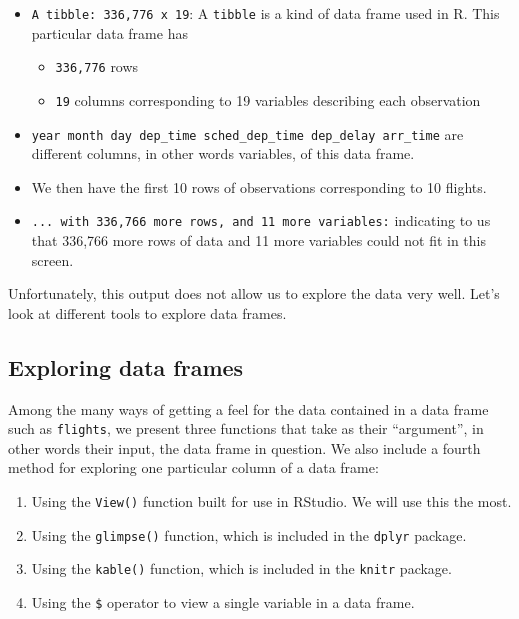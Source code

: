 \documentclass[
  letterpaper,
  DIV=11,
  numbers=noendperiod]{scrreprt}
\providecommand{\tightlist}{%
  \setlength{\itemsep}{0pt}\setlength{\parskip}{0pt}}\usepackage{longtable,booktabs,array}
\theoremstyle{definition}
\theoremstyle{remark}
\begin{document}
\begin{itemize}
\item
  \texttt{A\ tibble:\ 336,776\ x\ 19}: A \texttt{tibble} is a kind of
  data frame used in R. This particular data frame has

  \begin{itemize}
  \tightlist
  \item
    \texttt{336,776} rows
  \item
    \texttt{19} columns corresponding to 19 variables describing each
    observation
  \end{itemize}
\item
  \texttt{year\ month\ day\ dep\_time\ sched\_dep\_time\ dep\_delay\ arr\_time}
  are different columns, in other words variables, of this data frame.
\item
  We then have the first 10 rows of observations corresponding to 10
  flights.
\item
  \texttt{...\ with\ 336,766\ more\ rows,\ and\ 11\ more\ variables:}
  indicating to us that 336,766 more rows of data and 11 more variables
  could not fit in this screen.
\end{itemize}

Unfortunately, this output does not allow us to explore the data very
well. Let's look at different tools to explore data frames.

\hypertarget{sec-exploredataframes}{%
\subsection{Exploring data frames}\label{sec-exploredataframes}}

Among the many ways of getting a feel for the data contained in a data
frame such as \texttt{flights}, we present three functions that take as
their ``argument'', in other words their input, the data frame in
question. We also include a fourth method for exploring one particular
column of a data frame:

\begin{enumerate}
\def\labelenumi{\arabic{enumi}.}
\tightlist
\item
  Using the \texttt{View()} function built for use in RStudio. We will
  use this the most.
\item
  Using the \texttt{glimpse()} function, which is included in the
  \texttt{dplyr} package.
\item
  Using the \texttt{kable()} function, which is included in the
  \texttt{knitr} package.
\item
  Using the \texttt{\$} operator to view a single variable in a data
  frame.
\end{enumerate}
\end{document}
